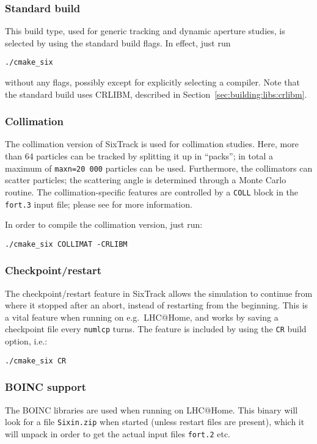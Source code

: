 \documentclass[english,BCOR=0mm,DIV=18]{scrartcl}
\begin{document}
\subsubsection{Standard build}
This build type, used for generic tracking and dynamic aperture studies, is selected by using the standard build flags.
In effect, just run
\begin{lstlisting}
./cmake_six
\end{lstlisting}
without any flags, possibly except for explicitly selecting a compiler.
Note that the standard build uses CRLIBM, described in Section~\ref{sec:building:libs:crlibm}.

\subsubsection{Collimation}
The collimation version of SixTrack is used for collimation studies.
Here, more than 64 particles can be tracked by splitting it up in ``packs''; in total a maximum of \texttt{maxn=20\,000} particles can be used.
Furthermore, the collimators can scatter particles; the scattering angle is determined through a Monte Carlo routine.
The collimation-specific features are controlled by a \texttt{COLL} block in the \texttt{fort.3} input file; please see  for more information.

In order to compile the collimation version, just run:
\begin{lstlisting}
./cmake_six COLLIMAT -CRLIBM
\end{lstlisting}


\subsubsection{Checkpoint/restart}
The checkpoint/restart feature in SixTrack allows the simulation to continue from where it stopped after an abort, instead of restarting from the beginning.
This is a vital feature when running on e.g.\ LHC@Home, and works by saving a checkpoint file every \texttt{numlcp} turns.
The feature is included by using the \texttt{CR} build option, i.e.:
\begin{lstlisting}
./cmake_six CR
\end{lstlisting}

\subsubsection{BOINC support}
\label{sec:building:options:BOINC}
The BOINC libraries are used when running on LHC@Home.
This binary will look for a file \texttt{Sixin.zip} when started (unless restart files are present), which it will unpack in order to get the actual input files \texttt{fort.2} etc.
\end{document}
